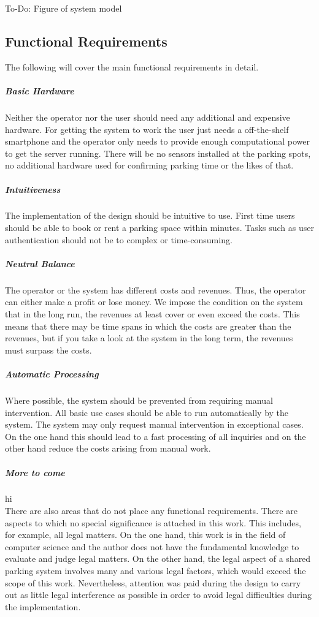 \documentclass[
a4paper,     %
titlepage,   %
14pt         %
]{scrartcl}  %
\theoremstyle{mystyle}
\begin{document}
To-Do: Figure of system model

\subsection{Functional Requirements}
The following will cover the main functional requirements in detail.
\subparagraph{Basic Hardware} Neither the operator nor the user should need any additional and expensive hardware. For getting the system to work the user just needs a off-the-shelf smartphone and the operator only needs to provide enough computational power to get the server running. There will be no sensors installed at the parking spots, no additional hardware used for confirming parking time or the likes of that.
\subparagraph{Intuitiveness} The implementation of the design should be intuitive to use. First time users should be able to book or rent a parking space within minutes. Tasks such as user authentication should not be to complex or time-consuming.
\subparagraph{Neutral Balance} The operator or the system has different costs and revenues. Thus, the operator can either make a profit or lose money. We impose the condition on the system that in the long run, the revenues at least cover or even exceed the costs. This means that there may be time spans in which the costs are greater than the revenues, but if you take a look at the system in the long term, the revenues must surpass the costs.
\subparagraph{Automatic Processing} Where possible, the system should be prevented from requiring manual intervention. All basic use cases should be able to run automatically by the system. The system may only request manual intervention in exceptional cases. On the one hand this should lead to a fast processing of all inquiries and on the other hand reduce the costs arising from manual work.
\subparagraph{More to come}hi\\

There are also areas that do not place any functional requirements. There are aspects to which no special significance is attached in this work. This includes, for example, all legal matters. On the one hand, this work is in the field of computer science and the author does not have the fundamental knowledge to evaluate and judge legal matters. On the other hand, the legal aspect of a shared parking system involves many and various legal factors, which would exceed the scope of this work. Nevertheless, attention was paid during the design to carry out as little legal interference as possible in order to avoid legal difficulties during the implementation.
\end{document}
